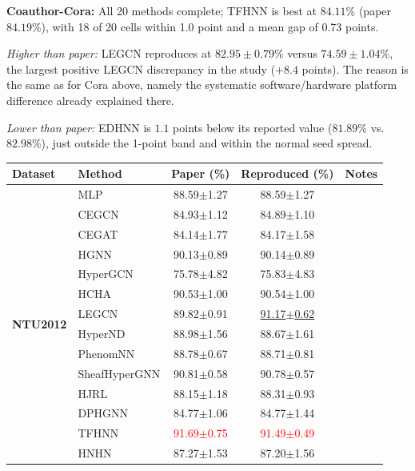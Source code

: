 \documentclass[11pt,a4paper]{article}
\begin{document}
\par\smallskip
\noindent\textbf{Coauthor-Cora:} All 20 methods complete; TFHNN is best at $84.11\%$ (paper $84.19\%$), with 18 of 20 cells within 1.0 point and a mean gap of 0.73 points.

\noindent\textit{Higher than paper:} LEGCN reproduces at $82.95\pm0.79\%$ versus $74.59\pm1.04\%$, the largest positive LEGCN discrepancy in the study ($+8.4$ points). The reason is the same as for Cora above, namely the systematic software/hardware platform difference already explained there.

\noindent\textit{Lower than paper:} EDHNN is $1.1$ points below its reported value ($81.89\%$ vs. $82.98\%$), just outside the 1-point band and within the normal seed spread.

\begin{table}[H]
	\centering\small
	\begin{tabular}{llccc}
		\toprule
		Dataset & Method & Paper (\%) & Reproduced (\%) & Notes \\
		\midrule
		\multirow{20}{*}{\textbf{NTU2012}} & MLP               & 88.59$\pm$1.27   & 88.59$\pm$1.27   &  \\
		 & CEGCN             & 84.93$\pm$1.12   & 84.89$\pm$1.10   &  \\
		 & CEGAT             & 84.14$\pm$1.77   & 84.17$\pm$1.58   &  \\
		 & HGNN              & 90.13$\pm$0.89   & 90.14$\pm$0.89   &  \\
		 & HyperGCN          & 75.78$\pm$4.82   & 75.83$\pm$4.83   &  \\
		 & HCHA              & 90.53$\pm$1.00   & 90.54$\pm$1.00   &  \\
		 & LEGCN             & 89.82$\pm$0.91   & \underline{91.17$\pm$0.62}   &  \\
		 & HyperND           & 88.98$\pm$1.56   & 88.67$\pm$1.61   &  \\
		 & PhenomNN          & 88.78$\pm$0.67   & 88.71$\pm$0.81   &  \\
		 & SheafHyperGNN     & 90.81$\pm$0.58   & 90.78$\pm$0.57   &  \\
		 & HJRL              & 88.15$\pm$1.18   & 88.31$\pm$0.93   &  \\
		 & DPHGNN            & 84.77$\pm$1.06   & 84.77$\pm$1.44   &  \\
		 & TFHNN             & \textcolor{red}{91.69$\pm$0.75}   & \textcolor{red}{91.49$\pm$0.49}   &  \\
		 & HNHN              & 87.27$\pm$1.53   & 87.20$\pm$1.56   &  \\

\end{tabular}
\end{table}
\end{document}
